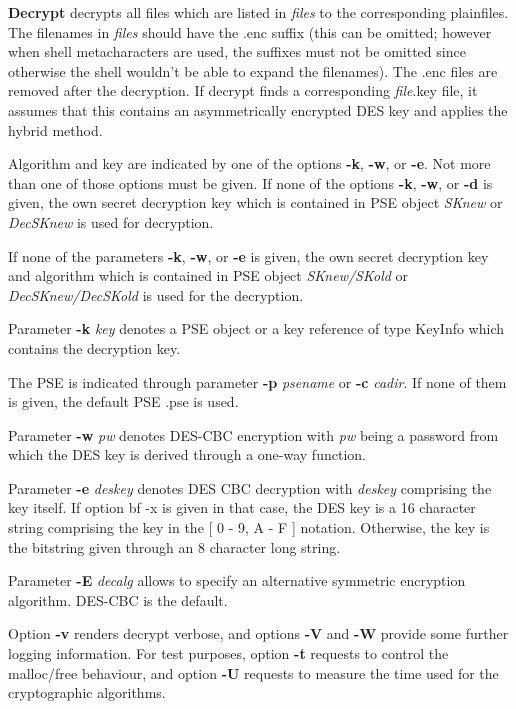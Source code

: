 {\large\bf Decrypt} decrypts all files which are listed in {\em files} to the corresponding
plainfiles. The filenames in {\em files} should have the .enc suffix (this can be omitted;
however when shell metacharacters are used, the suffixes must not be omitted since
otherwise the shell wouldn't be able to expand the filenames). The .enc files are
removed after the decryption. If decrypt
finds a corresponding {\em file}.key file, it assumes that this contains an asymmetrically
encrypted DES key and applies the hybrid method.
 
Algorithm and key are indicated by one of the options 
{\bf -k}, {\bf -w}, or {\bf -e}. Not more than one of those options 
must be given. If none of the options {\bf -k}, {\bf -w}, or {\bf -d} is given, the own
secret decryption key which is contained in PSE object {\em SKnew} or
{\em DecSKnew} is used for decryption. 

If none of the parameters {\bf -k}, {\bf -w}, or {\bf -e} is given, the own secret
decryption key and algorithm which is contained in PSE object {\em SKnew/SKold} or {\em 
DecSKnew/DecSKold}
is used for the decryption.
 
Parameter {\bf -k} {\em key} denotes a PSE object or a key reference of type KeyInfo
which contains the decryption key.
 
The PSE is indicated through parameter {\bf -p} {\em psename} or {\bf -c} {\em cadir}. If none of them
is given, the default PSE .pse is used.

Parameter {\bf -w} {\em pw} denotes DES-CBC encryption with {\em pw} being a password from which the 
DES key 
is derived through a one-way function.
 
Parameter {\bf -e} {\em deskey} denotes DES CBC decryption with {\em deskey} comprising the key itself.
If option {bf -x} is given in that case, the DES key is a 16 character string comprising
the key in the [ 0 - 9, A - F ] notation. Otherwise, the key is the bitstring given through
an 8 character long string.

Parameter {\bf -E} {\em decalg} allows to specify an alternative symmetric encryption algorithm.
DES-CBC is the default.

Option {\bf -v} renders decrypt verbose, and options {\bf -V} and {\bf -W} provide some further logging
information. For test purposes, option {\bf -t} requests
to control the malloc/free behaviour, and option {\bf -U} requests to measure the time used for the 
cryptographic
algorithms.
\\ [1em]

